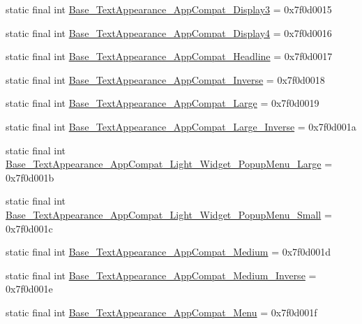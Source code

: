 \begin{DoxyCompactItemize}
\item 
static final int \mbox{\hyperlink{classandroid_1_1support_1_1design_1_1_r_1_1style_a275f10f2ac27d2da0ba760911d80f132}{Base\+\_\+\+Text\+Appearance\+\_\+\+App\+Compat\+\_\+\+Display3}} = 0x7f0d0015
\item 
static final int \mbox{\hyperlink{classandroid_1_1support_1_1design_1_1_r_1_1style_a4e66214538390426535adc790a14e781}{Base\+\_\+\+Text\+Appearance\+\_\+\+App\+Compat\+\_\+\+Display4}} = 0x7f0d0016
\item 
static final int \mbox{\hyperlink{classandroid_1_1support_1_1design_1_1_r_1_1style_aac8bfe611719aa125f106f747f4c582e}{Base\+\_\+\+Text\+Appearance\+\_\+\+App\+Compat\+\_\+\+Headline}} = 0x7f0d0017
\item 
static final int \mbox{\hyperlink{classandroid_1_1support_1_1design_1_1_r_1_1style_a8f575fb7354eb689d4fa5a254cec65bf}{Base\+\_\+\+Text\+Appearance\+\_\+\+App\+Compat\+\_\+\+Inverse}} = 0x7f0d0018
\item 
static final int \mbox{\hyperlink{classandroid_1_1support_1_1design_1_1_r_1_1style_a92a330241ceb1bd4b3d508a9024f69ce}{Base\+\_\+\+Text\+Appearance\+\_\+\+App\+Compat\+\_\+\+Large}} = 0x7f0d0019
\item 
static final int \mbox{\hyperlink{classandroid_1_1support_1_1design_1_1_r_1_1style_a3af9338b78523cbd0bf2bb8c522aa6e8}{Base\+\_\+\+Text\+Appearance\+\_\+\+App\+Compat\+\_\+\+Large\+\_\+\+Inverse}} = 0x7f0d001a
\item 
static final int \mbox{\hyperlink{classandroid_1_1support_1_1design_1_1_r_1_1style_a5541db6161143bcd88a34c99173206b0}{Base\+\_\+\+Text\+Appearance\+\_\+\+App\+Compat\+\_\+\+Light\+\_\+\+Widget\+\_\+\+Popup\+Menu\+\_\+\+Large}} = 0x7f0d001b
\item 
static final int \mbox{\hyperlink{classandroid_1_1support_1_1design_1_1_r_1_1style_a7030c0ee4caa8ad4f83264595a9665ac}{Base\+\_\+\+Text\+Appearance\+\_\+\+App\+Compat\+\_\+\+Light\+\_\+\+Widget\+\_\+\+Popup\+Menu\+\_\+\+Small}} = 0x7f0d001c
\item 
static final int \mbox{\hyperlink{classandroid_1_1support_1_1design_1_1_r_1_1style_a84633763d93f6cad04ea614f8458d723}{Base\+\_\+\+Text\+Appearance\+\_\+\+App\+Compat\+\_\+\+Medium}} = 0x7f0d001d
\item 
static final int \mbox{\hyperlink{classandroid_1_1support_1_1design_1_1_r_1_1style_a5b24f05ad226eb4d1d3eb501c1149688}{Base\+\_\+\+Text\+Appearance\+\_\+\+App\+Compat\+\_\+\+Medium\+\_\+\+Inverse}} = 0x7f0d001e
\item 
static final int \mbox{\hyperlink{classandroid_1_1support_1_1design_1_1_r_1_1style_a02a1f468dcd22f86db2c9461e3bed64f}{Base\+\_\+\+Text\+Appearance\+\_\+\+App\+Compat\+\_\+\+Menu}} = 0x7f0d001f

\end{DoxyCompactItemize}
